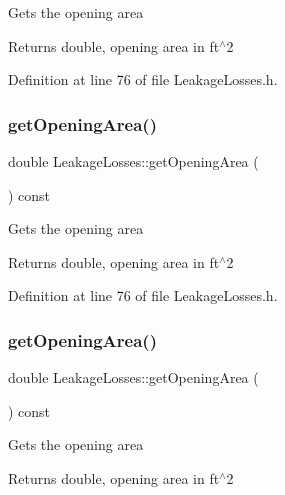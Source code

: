 Gets the opening area \begin{DoxyReturn}{Returns}
double, opening area in ft$^\wedge$2 
\end{DoxyReturn}


Definition at line 76 of file Leakage\+Losses.\+h.

\mbox{\label{class_leakage_losses_a6b31fbefaa16a5a52ce423b9531e84fa}} 
\subsubsection{\texorpdfstring{get\+Opening\+Area()}{getOpeningArea()}\hspace{0.1cm}{\footnotesize\ttfamily [2/3]}}
{\footnotesize\ttfamily double Leakage\+Losses\+::get\+Opening\+Area (\begin{DoxyParamCaption}{ }\end{DoxyParamCaption}) const\hspace{0.3cm}{\ttfamily [inline]}}

Gets the opening area \begin{DoxyReturn}{Returns}
double, opening area in ft$^\wedge$2 
\end{DoxyReturn}


Definition at line 76 of file Leakage\+Losses.\+h.

\mbox{\label{class_leakage_losses_a6b31fbefaa16a5a52ce423b9531e84fa}} 
\subsubsection{\texorpdfstring{get\+Opening\+Area()}{getOpeningArea()}\hspace{0.1cm}{\footnotesize\ttfamily [3/3]}}
{\footnotesize\ttfamily double Leakage\+Losses\+::get\+Opening\+Area (\begin{DoxyParamCaption}{ }\end{DoxyParamCaption}) const\hspace{0.3cm}{\ttfamily [inline]}}

Gets the opening area \begin{DoxyReturn}{Returns}
double, opening area in ft$^\wedge$2 
\end{DoxyReturn}


